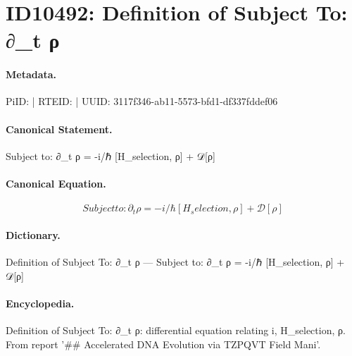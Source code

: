 \section*{ID10492: Definition of Subject To: ∂\_t ρ}
\paragraph{Metadata.}
PiID:  | RTEID:  | UUID: 3117f346-ab11-5573-bfd1-df337fddef06

\paragraph{Canonical Statement.}
Subject to: ∂\_t ρ = -i/ℏ [H\_selection, ρ] + 𝒟[ρ]

\paragraph{Canonical Equation.}
\[
Subject to: ∂_t ρ = -i/ℏ [H_selection, ρ] + 𝒟[ρ]
\]

\paragraph{Dictionary.}
Definition of Subject To: ∂\_t ρ — Subject to: ∂\_t ρ = -i/ℏ [H\_selection, ρ] + 𝒟[ρ]

\paragraph{Encyclopedia.}
Definition of Subject To: ∂\_t ρ: differential equation relating i, H\_selection, ρ. From report '\#\# Accelerated DNA Evolution via TZPQVT Field Mani'.
